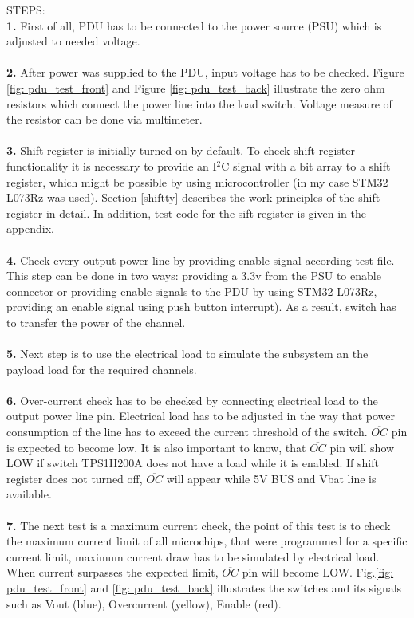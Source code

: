 STEPS:\\
\textbf{1.}  First of all, PDU has to be connected to the power source (PSU) which is adjusted to needed voltage.\\ \\
\textbf{2.} After power was supplied to the PDU, input voltage has to be checked. Figure \ref{fig: pdu_test_front} and Figure \ref{fig: pdu_test_back} illustrate the zero ohm resistors which connect the power line into the load switch. Voltage measure of the resistor can be done via multimeter. \\ \\
\textbf{3.} Shift register is initially turned on by default. To check shift register functionality it is necessary to provide an I$^2$C signal with a bit array to a shift register, which might be possible by using microcontroller (in my case STM32 L073Rz was used). Section \ref{shiftty} describes the work principles of the shift register in detail. In addition, test code for the sift register is given in the appendix. \\ \\
\textbf{4.} Check every output power line by providing enable signal according test file. This step can be done in two ways: providing a 3.3v from the PSU to enable connector or providing
enable signals to the PDU by using STM32 L073Rz, providing an enable signal using push button interrupt). As a result, switch has to transfer the power of the channel.\\ \\
\textbf{5.} Next step is to use the electrical load to simulate the subsystem an the payload load for the required channels.\\ \\
\textbf{6.} Over-current check has to be checked by connecting electrical load to the output power line
pin. Electrical load has to be adjusted in the way that power consumption of the line has to exceed the current
threshold of the switch. $\overline{OC}$ pin is expected to become low.
It is also important to know, that $\overline{OC}$ pin will show LOW if switch TPS1H200A does not have a load while it is enabled. If shift register does not turned off, $\overline{OC}$ will appear while 5V BUS and Vbat line is available.\\ \\
\textbf{7.} The next test is a maximum current check, the point of this test is to check the maximum current limit of all microchips, that were programmed for a
specific current limit, maximum current draw has to be simulated by electrical load. When current surpasses the expected
limit, $\overline{OC}$ pin will become LOW.
Fig.\ref{fig: pdu_test_front} and \ref{fig: pdu_test_back} illustrates the switches and its signals such as Vout (blue), Overcurrent (yellow), Enable (red).

